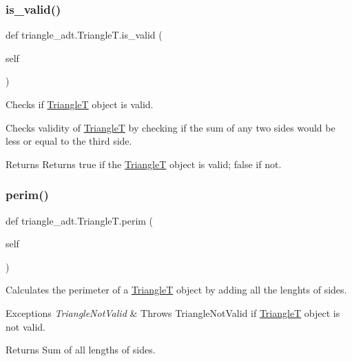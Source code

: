 \subsubsection{\texorpdfstring{is\+\_\+valid()}{is\_valid()}}
{\footnotesize\ttfamily def triangle\+\_\+adt.\+Triangle\+T.\+is\+\_\+valid (\begin{DoxyParamCaption}\item[{}]{self }\end{DoxyParamCaption})}



Checks if \hyperlink{classtriangle__adt_1_1_triangle_t}{TriangleT} object is valid. 

Checks validity of \hyperlink{classtriangle__adt_1_1_triangle_t}{TriangleT} by checking if the sum of any two sides would be less or equal to the third side. \begin{DoxyReturn}{Returns}
Returns true if the \hyperlink{classtriangle__adt_1_1_triangle_t}{TriangleT} object is valid; false if not. 
\end{DoxyReturn}
\mbox{\label{classtriangle__adt_1_1_triangle_t_aeb7d763a098e7d8d23b78c69d375154c}} 
\subsubsection{\texorpdfstring{perim()}{perim()}}
{\footnotesize\ttfamily def triangle\+\_\+adt.\+Triangle\+T.\+perim (\begin{DoxyParamCaption}\item[{}]{self }\end{DoxyParamCaption})}



Calculates the perimeter of a \hyperlink{classtriangle__adt_1_1_triangle_t}{TriangleT} object by adding all the lenghts of sides. 


\begin{DoxyExceptions}{Exceptions}
{\em Triangle\+Not\+Valid} & Throws Triangle\+Not\+Valid if \hyperlink{classtriangle__adt_1_1_triangle_t}{TriangleT} object is not valid. \\
\hline
\end{DoxyExceptions}
\begin{DoxyReturn}{Returns}
Sum of all lengths of sides. 
\end{DoxyReturn}
\mbox{\label{classtriangle__adt_1_1_triangle_t_af33c895ca41f21cfc6441af8192a7998}} 
